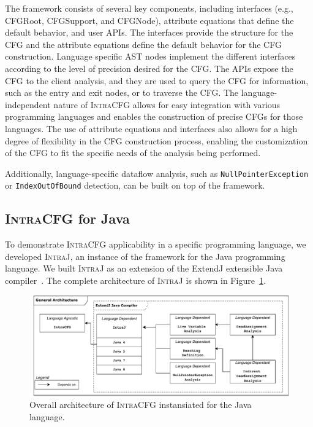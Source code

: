 The framework consists of several key components, including interfaces
(e.g., CFGRoot, CFGSupport, and CFGNode), attribute equations that define the
default behavior, and user APIs. The interfaces provide the structure for the
CFG and the attribute equations define the default behavior for the CFG
construction. Language specific AST nodes implement the different interfaces 
according to the level of precision desired for the CFG.
The APIs expose the CFG to the client analysis, and they are used to query the CFG
for information, such as the entry and exit nodes, or to traverse the CFG.
The language-independent nature of \textsc{IntraCFG} allows for easy integration 
with various programming languages and enables the construction of precise CFGs 
for those languages. The use of attribute equations and interfaces also allows 
for a high degree of flexibility in the CFG construction process, 
enabling the customization of the CFG to fit the specific needs of the 
analysis being performed.

Additionally, language-specific dataflow analysis, such as \texttt{NullPointerException} or
\texttt{IndexOutOfBound} detection, can be built on top of the framework.





\subsection{\textsc{IntraCFG} for Java}
To demonstrate \textsc{IntraCFG} applicability in a specific programming language, we developed
\textsc{IntraJ}, an instance of the framework for the Java programming language.
We built \textsc{IntraJ} as an extension of the ExtendJ extensible Java compiler~\cite{DBLP:conf/oopsla/EkmanH07}.
The complete architecture of \textsc{IntraJ} is shown in Figure~\ref{fig:intraJ}.
\begin{figure}[H]
    \centering
    \includegraphics[scale=0.5]{kappa/img/architecturejava.pdf}
    \caption{\label{fig:intraJ} Overall architecture of \textsc{IntraCFG} instansiated for the Java language.}
\end{figure}

